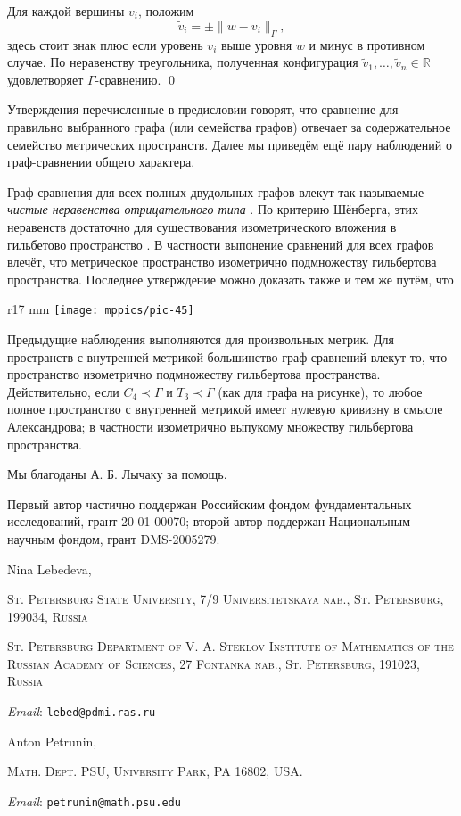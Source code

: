 \documentclass{article}
\makeatletter
\newcommand{\Addresses}{{\bigskip\footnotesize

\noindent Nina Lebedeva,
\par\nopagebreak
 \textsc{St. Petersburg State University, 7/9 Universitetskaya nab., St. Petersburg, 199034, Russia}
\par
\nopagebreak
 \textsc{St. Petersburg Department of V. A. Steklov Institute of Mathematics of the Russian Academy of Sciences, 27 Fontanka nab., St. Petersburg, 191023, Russia}
  \par\nopagebreak
  \textit{Email}: \texttt{lebed@pdmi.ras.ru}

\medskip

\noindent   Anton Petrunin, 
\par\nopagebreak
 \textsc{Math. Dept. PSU, University Park, PA 16802, USA.}
  \par\nopagebreak
  \textit{Email}: \texttt{petrunin@math.psu.edu}
  
}}
\def\parbf#1{\medskip\noindent{\bf #1}}
\def\qeds{\qed\par\medskip}
\makeatother
\begin{document}
Для каждой вершины $v_i$, положим
\[\tilde v_i=\pm \|w-v_i\|_\Gamma,\]
здесь стоит знак плюс если уровень $v_i$ выше уровня $w$ и минус в противном случае.
По неравенству треугольника, полученная конфигурация $\tilde v_1,\dots,\tilde v_n\in\mathbb{R}$ удовлетворяет $\Gamma$-сравнению.
\qeds

\parbf{Замечания.}
Утверждения перечисленные в предисловии говорят, что сравнение для правильно выбранного графа (или семейства графов) отвечает за содержательное семейство метрических пространств.
Далее мы приведём ещё пару наблюдений о граф-сравнении общего характера.

Граф-сравнения для всех полных двудольных графов влекут так называемые \emph{чистые неравенства отрицательного типа} \cite[6.1.1]{deza-laurent-ru}.
По критерию Шёнберга, этих неравенств достаточно для существования изометрического вложения в гильбетово пространство \cite[6.2.1]{deza-laurent}.
В частности выпонение сравнений для всех графов влечёт, что метрическое пространство изометрично подмножеству гильбертова пространства.
Последнее утверждение можно доказать также и тем же путём, что \cite[Prop. 1.9]{toyoda}


\begin{wrapfigure}{r}{17 mm}
\vskip-6mm
\centering
\texttt{[image: mppics/pic-45]}
\vskip-2mm
\end{wrapfigure}

Предыдущие наблюдения выполняются для произвольных метрик.
Для пространств с внутренней метрикой большинство граф-сравнений влекут то, что пространство изометрично подмножеству гильбертова пространства.
Действительно, если $C_4\prec\Gamma$ и $T_3\prec\Gamma$ (как для графа на рисунке),
то любое полное пространство с внутренней метрикой имеет нулевую кривизну в смысле Александрова; 
в частности изометрично выпукому множеству гильбертова пространства.





\parbf{Благодарности.}
Мы благоданы А. Б. Лычаку за помощь. 

Первый автор частично поддержан Российским фондом фундаментальных исследований, грант 20-01-00070;
второй автор поддержан Национальным научным фондом, грант DMS-2005279.

{\sloppy
\printbibliography[heading=bibintoc]
\fussy
}

\Addresses
\end{document}
